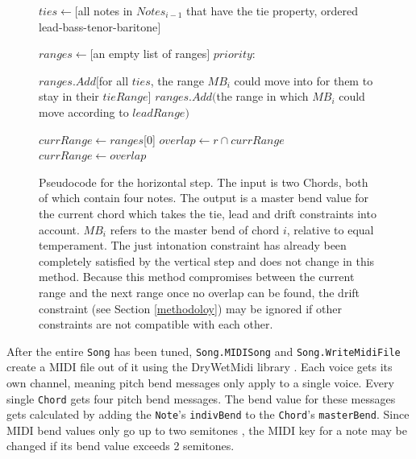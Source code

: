 \documentclass[a4paper]{article}
\newlength\myindent
\newcommand{\IndState}[1][1]{\State\hspace{#1\myindent}}
\begin{document}
\begin{figure}
	\begin{algorithmic}[1]
		\State $\mathit{ties} \gets [$all notes in $\mathit{Notes}_{i-1}$ that have the tie property, ordered lead-bass-tenor-baritone$]$
		
		\State $\mathit{ranges} \gets [$an empty list of ranges$]$
		 $\mathit{priority}$:
		
		\IndState $\mathit{ranges}.Add[$for all $\mathit{ties}$, the range $\mathit{MB}_i$ could move into for them to stay in their $\mathit{tieRange}]$
		\IndState $\mathit{ranges.Add}($the range in which $\mathit{MB}_i$ could move according to $\mathit{leadRange})$
		
		\State{}
		\Else
		\State $\mathit{currRange} \gets \mathit{ranges}$[0]
		\State $\mathit{overlap} \gets r \cap \mathit{currRange}$
		\State {}
		\Else
		\State $\mathit{currRange} \gets \mathit{overlap}$
		\EndIf
		\EndFor
		
		\State{}
		\EndIf
		\EndProcedure
	\end{algorithmic}
	\caption{Pseudocode for the horizontal step. The input is two Chords, both of which contain four notes. The output is a master bend value for the current chord which takes the tie, lead and drift constraints into account. $\mathit{MB}_i$ refers to the master bend of chord $i$, relative to equal temperament. The just intonation constraint has already been completely satisfied by the vertical step and does not change in this method. Because this method compromises between the current range and the next range once no overlap can be found, the drift constraint (see Section \ref{methodoloy}) may be ignored if other constraints are not compatible with each other.}
	\label{fig:pseudocodeH}
\end{figure}

After the entire \texttt{Song} has been tuned, \texttt{Song.MIDISong} and \texttt{Song.WriteMidiFile} create a MIDI file out of it using the DryWetMidi library \cite{dobroselsky_melanchalldrywetmidi_2023}. Each voice gets its own channel, meaning pitch bend messages only apply to a single voice. Every single \texttt{Chord} gets four pitch bend messages. The bend value for these messages gets calculated by adding the \texttt{Note}'s \texttt{indivBend} to the \texttt{Chord}'s \texttt{masterBend}. Since MIDI bend values only go up to two semitones \cite{midi_manufacturers_association_complete_2014}, the MIDI key for a note may be changed if its bend value exceeds 2 semitones.
\end{document}

